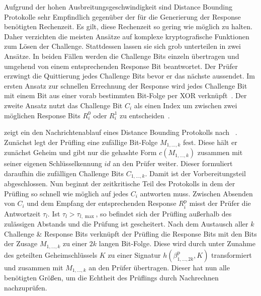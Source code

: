 Aufgrund der hohen Ausbreitungsgeschwindigkeit sind \foreignlanguage{english}{Distance Bounding} Protokolle sehr Empfindlich gegenüber der für die Generierung der \foreignlanguage{english}{Response} benötigten Rechenzeit. Es gilt, diese Rechenzeit so gering wie möglich zu halten. Daher verzichten die meisten Ansätze auf komplexe kryptografische Funktionen zum Lösen der \foreignlanguage{english}{Challenge}. Stattdessen lassen sie sich grob unterteilen in zwei Ansätze. In beiden Fällen werden die \foreignlanguage{english}{Challenge} Bits einzeln übertragen und umgehend von einem entsprechenden \foreignlanguage{english}{Response} Bit beantwortet. Der Prüfer erzwingt die Quittierung jedes \foreignlanguage{english}{Challenge} Bits bevor er das nächste aussendet. Im ersten Ansatz zur schnellen Errechnung der \foreignlanguage{english}{Response} wird jedes \foreignlanguage{english}{Challenge} Bit mit einem Bit aus einer vorab bestimmten Bit-Folge per \foreignlanguage{english}{XOR} verknüpft~\cite{Brands1994}. Der zweite Ansatz nutzt das \foreignlanguage{english}{Challenge} Bit \(C_{i}\) als einen Index um zwischen zwei möglichen \foreignlanguage{english}{Response} Bits \(R_{i}^{0}\) oder \(R_{i}^{1}\) zu entscheiden~\cite{Hancke2005}.

 zeigt ein den Nachrichtenablauf eines \foreignlanguage{english}{Distance Bounding} Protokolls nach \citeauthor{Brands1994}~\cite{Brands1994}. Zunächst legt der Prüfling eine zufällige Bit-Folge \(M_{1, \dots, k}\) fest. Diese hält er zunächst Geheim und gibt nur die gehashte Form \(c(M_{1, \dots, k})\) zusammen mit seiner eigenen Schlüsselkennung \(\mathit{id}\) an den Prüfer weiter. Dieser formuliert daraufhin die zufälligen \foreignlanguage{english}{Challenge} Bits \(C_{1, \dots, k}\). Damit ist der Vorbereitungsteil abgeschlossen. Nun beginnt der zeitkritische Teil des Protokolls in dem der Prüfling so schnell wie möglich auf jedes \(C_{i}\) antworten muss. Zwischen Absenden von \(C_{i}\) und dem Empfang der entsprechenden \foreignlanguage{english}{Response} \(R_{i}^{\mathrm{p}}\) misst der Prüfer die Antwortzeit \(\tau_{l}\). Ist \(\tau_{l} > \tau_{l, \max}\), so befindet sich der Prüfling außerhalb des zulässigen Abstands und die Prüfung ist gescheitert. Nach dem Austausch aller \(k\) \foreignlanguage{english}{Challenge \& Response} Bits verknüpft der Prüfling die \foreignlanguage{english}{Response} Bits mit den Bits der Zusage \(M_{1, \dots, k}\) zu einer \(2k\) langen Bit-Folge. Diese wird durch unter Zunahme des geteilten Geheimschlüssels \(K\) zu einer Signatur \(h(\beta_{1, \dots, 2k}^{\mathrm{p}}, K)\) transformiert und zusammen mit \(M_{1, \dots, k}\) an den Prüfer übertragen. Dieser hat nun alle benötigten Größen, um die Echtheit des Prüflings durch Nachrechnen nachzuprüfen.

